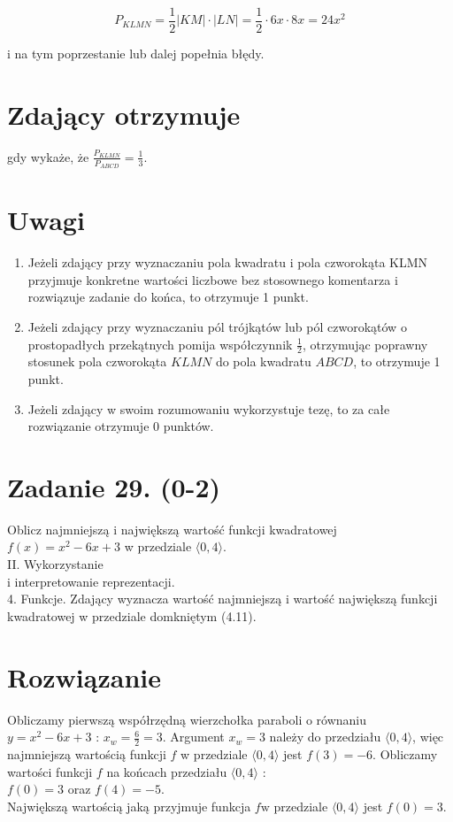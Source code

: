 \documentclass[10pt]{article}
\begin{document}
$$
P_{K L M N}=\frac{1}{2}|K M| \cdot|L N|=\frac{1}{2} \cdot 6 x \cdot 8 x=24 x^{2}
$$

i na tym poprzestanie lub dalej popełnia błędy.

\section*{Zdający otrzymuje}
gdy wykaże, że $\frac{P_{K L M N}}{P_{A B C D}}=\frac{1}{3}$.

\section*{Uwagi}
\begin{enumerate}
  \item Jeżeli zdający przy wyznaczaniu pola kwadratu i pola czworokąta KLMN przyjmuje konkretne wartości liczbowe bez stosownego komentarza i rozwiązuje zadanie do końca, to otrzymuje 1 punkt.
  \item Jeżeli zdający przy wyznaczaniu pól trójkątów lub pól czworokątów o prostopadłych przekątnych pomija współczynnik $\frac{1}{2}$, otrzymując poprawny stosunek pola czworokąta $K L M N$ do pola kwadratu $A B C D$, to otrzymuje 1 punkt.
  \item Jeżeli zdający w swoim rozumowaniu wykorzystuje tezę, to za całe rozwiązanie otrzymuje 0 punktów.
\end{enumerate}

\section*{Zadanie 29. (0-2)}
Oblicz najmniejszą i największą wartość funkcji kwadratowej $f(x)=x^{2}-6 x+3$ w przedziale $\langle 0,4\rangle$.\\
II. Wykorzystanie\\
i interpretowanie reprezentacji.\\
4. Funkcje. Zdający wyznacza wartość najmniejszą i wartość największą funkcji kwadratowej w przedziale domkniętym (4.11).

\section*{Rozwiązanie}
Obliczamy pierwszą współrzędną wierzchołka paraboli o równaniu $y=x^{2}-6 x+3$ : $x_{w}=\frac{6}{2}=3$. Argument $x_{w}=3$ należy do przedziału $\langle 0,4\rangle$, więc najmniejszą wartością funkcji $f$ w przedziale $\langle 0,4\rangle$ jest $f(3)=-6$. Obliczamy wartości funkcji $f$ na końcach przedziału $\langle 0,4\rangle$ :\\
$f(0)=3$ oraz $f(4)=-5$.\\
Największą wartością jaką przyjmuje funkcja $f \mathrm{w}$ przedziale $\langle 0,4\rangle$ jest $f(0)=3$.
\end{document}
